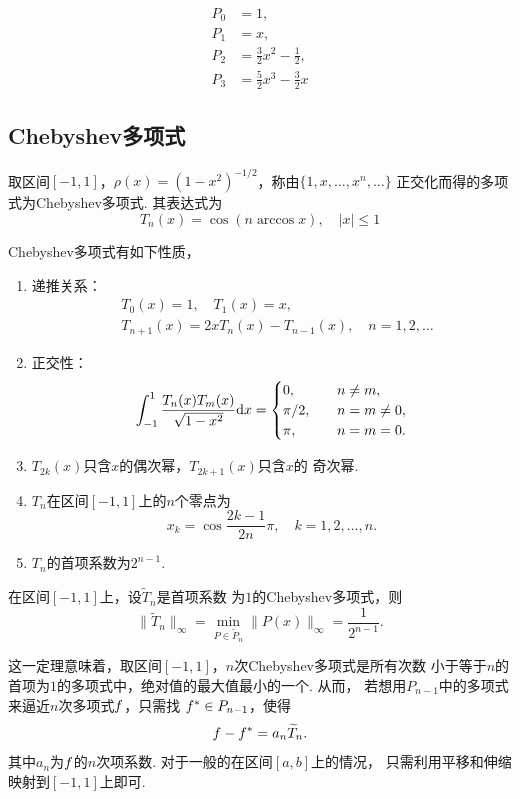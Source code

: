   \begin{lemma}[前$4$项Legendre多项式]
    \[\begin{split}
      P_0 &= 1,\\
      P_1 &= x,\\
      P_2 &= \frac{3}{2}x^2 - \frac{1}{2},\\
      P_3 &= \frac{5}{2}x^3 - \frac{3}{2}x
    \end{split}\]
  \end{lemma}

\newpage
\subsection{Chebyshev多项式}
  \begin{defi}[Chebyshev多项式]
    取区间$[-1, 1]$，$\rho(x)=(1-x^2)^{-1/2}$，称由$\{1,x,\dots,x^n,\dots\}$
    正交化而得的多项式为Chebyshev多项式. 其表达式为
    \[
      T_n(x) = \cos(n\arccos x),\quad|x|\le 1
    \]
  \end{defi}

  \begin{thm}[Chebyshev多项式的性质]
    Chebyshev多项式有如下性质，
    \begin{enumerate}
      \item 递推关系：
      \[\begin{split}
        &T_0(x) = 1, \quad T_1(x) = x,\\
        &T_{n+1}(x) = 2xT_n(x) - T_{n-1}(x),\quad n =1,2,\dots
      \end{split}\]
      \item 正交性：
      \[
        \int_{-1}^1\frac{T_n(x)T_m(x)}{\sqrt{1-x^2}} \mathrm{d} x =
        \begin{cases}
          0, &\quad n\ne m,\\
          \pi/2, &\quad n = m \ne 0,\\
          \pi,&\quad n = m = 0.
        \end{cases}
      \]
      \item $T_{2k}(x)$只含$x$的偶次幂，$T_{2k+1}(x)$只含$x$的
      奇次幂.
      \item $T_n$在区间$[-1, 1]$上的$n$个零点为
      \[
        x_k = \cos\frac{2k-1}{2n}\pi,\quad k = 1,2,\dots,n.
      \]
      \item $T_n$的首项系数为$2^{n-1}$.
    \end{enumerate}
  \end{thm}

  \begin{thm}[Chebyshev多项式的逼近性质]
    \label{thm: Chebyshev多项式的逼近性质}
    在区间$[-1,1]$上，设$\widetilde{T}_n$是首项系数
    为$1$的Chebyshev多项式，则
    \[
      \|\widetilde{T}_n\|_\infty = \min_{P\in\widetilde{P}_n}
      \|P(x)\|_\infty = \frac{1}{2^{n-1}}.
    \]
  \end{thm}
  \remark
    这一定理意味着，取区间$[-1, 1]$，$n$次Chebyshev多项式是所有次数
    小于等于$n$的首项为$1$的多项式中，绝对值的最大值最小的一个. 从而，
    若想用$P_{n-1}$中的多项式来逼近$n$次多项式$\mathnormal{f}$，只需找
    $\mathnormal{f}^*\in P_{n-1}$，使得
    \[
      \mathnormal{f} - \mathnormal{f}^* = a_n \widetilde{T}_n.
    \]
    其中$a_n$为$\mathnormal{f}$的$n$次项系数. 对于一般的在区间$[a, b]$上的情况，
    只需利用平移和伸缩映射到$[-1, 1]$上即可.

